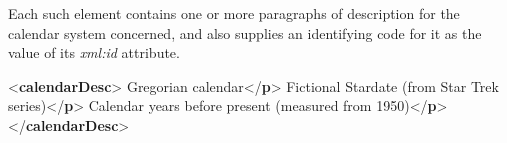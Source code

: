 Each such element contains one or more paragraphs of description for the calendar system concerned, and also supplies an identifying code for it as the value of its {\itshape xml:id} attribute. \par\bgroup{}\exampleFont \begin{shaded}\noindent\mbox{}{<\textbf{calendarDesc}>}\mbox{}\newline 
{}\mbox{}\newline 
\hspace*{1em}Gregorian calendar{</\textbf{p}>}\mbox{}\newline 
{}\mbox{}\newline 
{}\mbox{}\newline 
\hspace*{1em}Fictional Stardate (from Star Trek series){</\textbf{p}>}\mbox{}\newline 
{}\mbox{}\newline 
{}\mbox{}\newline 
\hspace*{1em}Calendar years before present (measured from 1950){</\textbf{p}>}\mbox{}\newline 
{}\mbox{}\newline 
{</\textbf{calendarDesc}>}\end{shaded}\egroup\par \par

